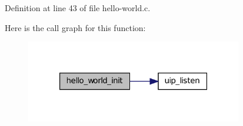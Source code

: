 Definition at line 43 of file hello-\/world.c.



Here is the call graph for this function:
\nopagebreak
\begin{figure}[H]
\begin{center}
\leavevmode
\includegraphics[width=268pt]{group__helloworld_gab97849f0d3ea858eee790b69591e6427_cgraph}
\end{center}
\end{figure}


